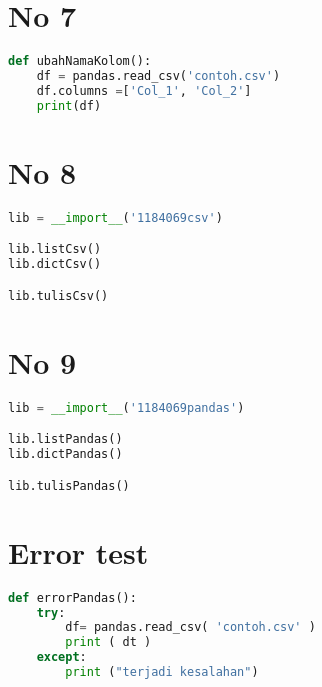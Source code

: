 \section*{No 7}
\begin{lstlisting}[language=Python]
def ubahNamaKolom():
    df = pandas.read_csv('contoh.csv')
    df.columns =['Col_1', 'Col_2'] 
    print(df)

\end{lstlisting}
\section*{No 8}
\begin{lstlisting}[language=Python]
lib = __import__('1184069csv')

lib.listCsv()
lib.dictCsv()

lib.tulisCsv()
\end{lstlisting}
\section*{No 9}
\begin{lstlisting}[language=Python]
lib = __import__('1184069pandas')

lib.listPandas()
lib.dictPandas()

lib.tulisPandas()
\end{lstlisting}

\section*{Error test}
\begin{lstlisting}[language=Python]
def errorPandas(): 
    try:
        df= pandas.read_csv( 'contoh.csv' ) 
        print ( dt ) 
    except: 
        print ("terjadi kesalahan")
\end{lstlisting}